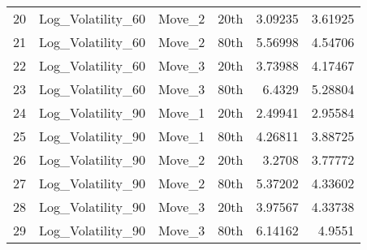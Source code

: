 \begin{tabular}{rlllrr}
 20 & Log\_Volatility\_60   & Move\_2        & 20th         & 3.09235 & 3.61925 \\
 21 & Log\_Volatility\_60   & Move\_2        & 80th         & 5.56998 & 4.54706 \\
 22 & Log\_Volatility\_60   & Move\_3        & 20th         & 3.73988 & 4.17467 \\
 23 & Log\_Volatility\_60   & Move\_3        & 80th         & 6.4329  & 5.28804 \\
 24 & Log\_Volatility\_90   & Move\_1        & 20th         & 2.49941 & 2.95584 \\
 25 & Log\_Volatility\_90   & Move\_1        & 80th         & 4.26811 & 3.88725 \\
 26 & Log\_Volatility\_90   & Move\_2        & 20th         & 3.2708  & 3.77772 \\
 27 & Log\_Volatility\_90   & Move\_2        & 80th         & 5.37202 & 4.33602 \\
 28 & Log\_Volatility\_90   & Move\_3        & 20th         & 3.97567 & 4.33738 \\
 29 & Log\_Volatility\_90   & Move\_3        & 80th         & 6.14162 & 4.9551  \\
\hline
\end{tabular}